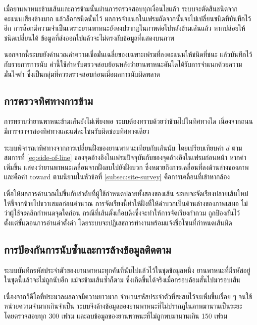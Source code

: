 เมื่อยานพาหนะข้ามเส้นและการข้ามนั้นผ่านการตรวจสอบทุกเงื่อนไขแล้ว ระบบจะตัดสินชนิดจากคะแนนเสียงข้างมาก แล้วล็อกชนิดนั้นไว้ ผลการจำแนกในเฟรมถัดจากนั้นจะไม่เปลี่ยนชนิดที่บันทึกไว้อีก  การล็อกมีความจำเป็นเพราะยานพาหนะยังคงปรากฏในภาพต่อไปหลังข้ามเส้นแล้ว หากปล่อยให้ชนิดเปลี่ยนได้ ข้อมูลที่ส่งออกไปแล้วจะไม่ตรงกับข้อมูลที่แสดงบนภาพ

นอกจากนี้ระบบยังคำนวณค่าความเชื่อมั่นเฉลี่ยของเฉพาะเฟรมที่ลงคะแนนให้ชนิดที่ชนะ แล้วบันทึกไว้กับรายการการนับ ค่านี้ใช้สำหรับตรวจสอบย้อนหลังว่ายานพาหนะคันใดได้รับการจำแนกด้วยความมั่นใจต่ำ ซึ่งเป็นกลุ่มที่ควรตรวจสอบก่อนเมื่อผลการนับผิดพลาด

\subsection{การตรวจทิศทางการข้าม}
\label{subsec:direction-check}

การทราบว่ายานพาหนะข้ามเส้นยังไม่เพียงพอ ระบบต้องทราบด้วยว่าข้ามไปในทิศทางใด เนื่องจากถนนมีการจราจรสองทิศทางและแต่ละโซนรับผิดชอบทิศทางเดียว

ระบบพิจารณาทิศทางจากการเปลี่ยนฝั่งของยานพาหนะเทียบกับเส้นนับ โดยเปรียบเทียบค่า $d$ ตามสมการที่ \ref{eq:side-of-line} ของจุดอ้างอิงในเฟรมปัจจุบันกับของจุดอ้างอิงในเฟรมก่อนหน้า หากค่าเพิ่มขึ้น แสดงว่ายานพาหนะเคลื่อนจากฝั่งลบไปยังฝั่งบวก ซึ่งหมายถึงการเคลื่อนที่ลงด้านล่างของภาพ และคือค่า toward ตามนิยามในหัวข้อที่ \ref{subsec:site-survey} คือการเคลื่อนที่เข้าหากล้อง

เพื่อให้ผลการคำนวณไม่ขึ้นกับลำดับที่ผู้ใช้กำหนดปลายทั้งสองของเส้น ระบบจะจัดเรียงปลายเส้นใหม่ให้ชี้จากซ้ายไปขวาเสมอก่อนคำนวณ การจัดเรียงนี้ทำให้ฝั่งที่ให้ค่าบวกเป็นด้านล่างของภาพเสมอ ไม่ว่าผู้ใช้จะคลิกกำหนดจุดใดก่อน  กรณีที่เส้นตั้งเกือบดิ่งซึ่งจะทำให้การจัดเรียงกำกวม ถูกป้องกันไว้ตั้งแต่ขั้นตอนการอ่านค่าตั้งค่า โดยระบบจะปฏิเสธการทำงานพร้อมแจ้งชื่อโซนที่กำหนดเส้นผิด

\subsection{การป้องกันการนับซ้ำและการล้างข้อมูลติดตาม}
\label{subsec:dedup}

ระบบบันทึกรหัสประจำตัวของยานพาหนะทุกคันที่นับไปแล้วไว้ในชุดข้อมูลหนึ่ง ยานพาหนะที่มีรหัสอยู่ในชุดนี้แล้วจะไม่ถูกนับอีก แม้จะข้ามเส้นซ้ำก็ตาม ซึ่งเกิดขึ้นได้จริงเมื่อกรอบล้อมสั่นไปมารอบเส้น

เนื่องจากวิดีโอที่ประมวลผลอาจมีความยาวมาก จำนวนรหัสประจำตัวที่สะสมไว้จะเพิ่มขึ้นเรื่อย ๆ จนใช้หน่วยความจำมากเกินจำเป็น ระบบจึงล้างข้อมูลของยานพาหนะที่ไม่ปรากฏในภาพมานานเป็นระยะ โดยตรวจสอบทุก 300 เฟรม และลบข้อมูลของยานพาหนะที่ไม่ถูกพบมานานเกิน 150 เฟรม

